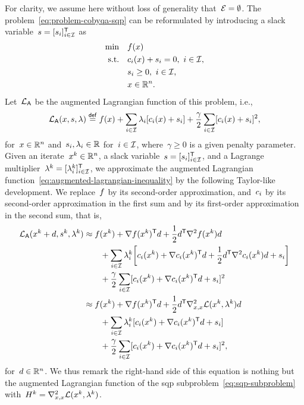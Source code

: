 For clarity, we assume here without loss of generality that~$\mathcal{E} = \emptyset$.
The problem~\cref{eq:problem-cobyqa-sqp} can be reformulated by introducing a slack variable~$s = [s_i]_{i \in \mathcal{I}}^{\mathsf{T}}$ as
\begin{align*}
    \min        & \quad \obj(\iter)\\
    \text{s.t.} & \quad \con{i}(\iter) + s_i = 0, ~ i \in \iub,\\
                & \quad s_i \ge 0, ~ i \in \iub,\\
                & \quad \iter \in \R^n.
\end{align*}
Let~$\lag[\mathsf{A}]$ be the augmented Lagrangian function of this problem, i.e.,
\begin{equation}
    \label{eq:augmented-lagrangian-inequality}
    \lag[\mathsf{A}](\iter, s, \lm) \eqdef \obj(\iter) + \sum_{i \in \iub} \lm_i [\con{i}(\iter) + s_i] + \frac{\gamma}{2} \sum_{i \in \iub} [\con{i}(\iter) + s_i]^2,
\end{equation}
for~$\iter \in \R^n$ and~$s_i, \lm_i \in \R$ for~$i \in \mathcal{I}$, where~$\gamma \ge 0$ is a given penalty parameter.
Given an iterate~$\iter[k] \in \R^n$, a slack variable~$s = [s_i]_{i \in \mathcal{I}}^{\mathsf{T}}$, and a Lagrange multiplier~$\lm[k] = [\lm[k]_i]_{i \in \iub}^{\T}$, we approximate the augmented Lagrangian function~\cref{eq:augmented-lagrangian-inequality} by the following Taylor-like development.
We replace~$f$ by its second-order approximation, and~$c_{i}$ by its second-order approximation in the first sum and by its first-order approximation in the second sum, that is,
\begin{align*}
    \lag[\mathsf{A}](\iter[k] + \step, s^k, \lm[k]) & \approx \obj(\iter[k]) + \nabla \obj(\iter[k])^{\T} \step + \frac{1}{2} \step^{\T} \nabla^2 \obj(\iter[k]) \step\\
                                                    & \qquad + \sum_{i \in \iub} \lm[k]_i \bigg[ \con{i}(\iter[k]) + \nabla \con{i}(\iter[k])^{\T} \step + \frac{1}{2} \step^{\T} \nabla^2 \con{i}(\iter[k]) \step + s_i \bigg]\\
                                                    & \qquad + \frac{\gamma}{2} \sum_{i \in \iub} [\con{i}(\iter[k]) + \nabla \con{i}(\iter[k])^{\T} \step + s_i]^2\\
                                                    & \approx \obj(\iter[k]) + \nabla \obj(\iter[k])^{\T} \step + \frac{1}{2} \step^{\T} \nabla_{x, x}^2 \lag(\iter[k], \lm[k]) \step\\
                                                    & \qquad + \sum_{i \in \iub} \lm[k]_i [\con{i}(\iter[k]) + \nabla \con{i}(\iter[k])^{\T} \step + s_i]\\
                                                    & \qquad + \frac{\gamma}{2} \sum_{i \in \iub} [\con{i}(\iter[k]) + \nabla \con{i}(\iter[k])^{\T} \step + s_i]^2,
\end{align*}
for~$\step \in \R^n$.
We thus remark the right-hand side of this equation is nothing but the augmented Lagrangian function of the \gls{sqp} subproblem~\cref{eq:sqp-subproblem} with~$H^k = \nabla_{x, x}^2 \lag(\iter[k], \lm[k])$.

